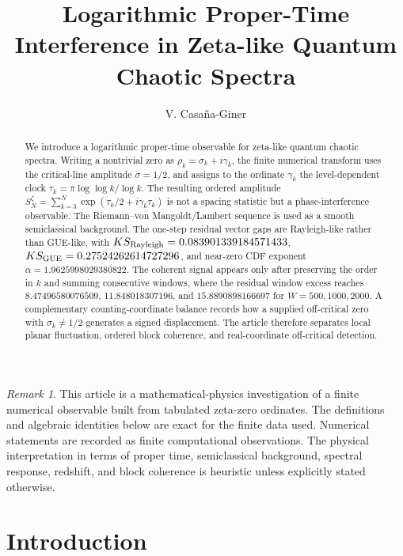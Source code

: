 \documentclass[11pt]{amsart}
\title{Logarithmic Proper-Time Interference in Zeta-like Quantum Chaotic Spectra}
\author{V. Casa\~na-Giner}
\date{}
\numberwithin{equation}{section}
\theoremstyle{plain}
\theoremstyle{definition}
\theoremstyle{remark}
\newtheorem{remark}[theorem]{Remark}
\begin{document}
\begin{abstract}
We introduce a logarithmic proper-time observable for zeta-like quantum chaotic spectra. Writing a nontrivial zero as \(\rho_k=\sigma_k+i\gamma_k\), the finite numerical transform uses the critical-line amplitude \(\sigma=1/2\), and assigns to the ordinate \(\gamma_k\) the level-dependent clock \(\tau_k=\pi\log\log k/\log k\). The resulting ordered amplitude \(S_N^\zeta=\sum_{k=3}^{N}\exp(\tau_k/2+i\gamma_k\tau_k)\) is not a spacing statistic but a phase-interference observable. The Riemann--von Mangoldt/Lambert sequence is used as a smooth semiclassical background. The one-step residual vector gaps are Rayleigh-like rather than GUE-like, with \(KS_{\rm Rayleigh}=0.083901339184571433\), \(KS_{\rm GUE}=0.27524262614727296\), and near-zero CDF exponent \(\alpha=1.9625998029380822\). The coherent signal appears only after preserving the order in \(k\) and summing consecutive windows, where the residual window excess reaches \(8.47496580076509\), \(11.848018307196\), and \(15.8890898166697\) for \(W=500,1000,2000\). A complementary counting-coordinate balance records how a supplied off-critical zero with \(\sigma_k\neq1/2\) generates a signed displacement. The article therefore separates local planar fluctuation, ordered block coherence, and real-coordinate off-critical detection.
\end{abstract}

\maketitle
\tableofcontents
\bigskip

\begin{remark}
\label{rem:mathematical_status}
This article is a mathematical-physics investigation of a finite numerical observable built from tabulated zeta-zero ordinates.  The definitions and algebraic identities below are exact for the finite data used.  Numerical statements are recorded as finite computational observations.  The physical interpretation in terms of proper time, semiclassical background, spectral response, redshift, and block coherence is heuristic unless explicitly stated otherwise.
\end{remark}

\section{Introduction}
\label{sec:introduction}
\end{document}
